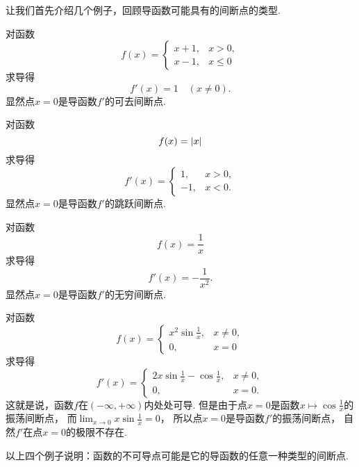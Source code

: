 让我们首先介绍几个例子，回顾导函数可能具有的间断点的类型.

\begin{example}
对函数\begin{equation*}
	f(x) = \left\{ \begin{array}{cl}
		x+1, & x>0, \\
		x-1, & x\leq0
	\end{array} \right.
\end{equation*}求导得\begin{equation*}
	f'(x) = 1
	\quad(x\neq0).
\end{equation*}
显然点\(x=0\)是导函数\(f'\)的可去间断点.
\end{example}

\begin{example}
对函数\begin{equation*}
	f(x) = \abs{x}
\end{equation*}求导得\begin{equation*}
	f'(x) = \left\{ \begin{array}{cl}
		1, & x>0, \\
		-1, & x<0.
	\end{array} \right.
\end{equation*}
显然点\(x=0\)是导函数\(f'\)的跳跃间断点.
\end{example}

\begin{example}
对函数\begin{equation*}
	f(x) = \frac1x
\end{equation*}求导得\begin{equation*}
	f'(x) = -\frac1{x^2}.
\end{equation*}
显然点\(x=0\)是导函数\(f'\)的无穷间断点.
\end{example}

\begin{example}
对函数\begin{equation*}
	f(x) = \left\{ \begin{array}{cl}
		x^2 \sin\frac1x, & x \neq 0, \\
		0, & x = 0
	\end{array} \right.
\end{equation*}求导得\begin{equation*}
	f'(x) = \left\{ \begin{array}{cl}
		2x \sin\frac1x - \cos\frac1x, & x \neq 0, \\
		0, & x = 0.
	\end{array} \right.
\end{equation*}
这就是说，函数\(f\)在\((-\infty,+\infty)\)内处处可导.
但是由于点\(x=0\)是函数\(x \mapsto \cos\frac1x\)的振荡间断点，
而\(\lim_{x\to0} x \sin\frac1x = 0\)，
所以点\(x=0\)是导函数\(f'\)的振荡间断点，
自然\(f'\)在点\(x=0\)的极限不存在.
\end{example}

以上四个例子说明：函数的不可导点可能是它的导函数的任意一种类型的间断点.
